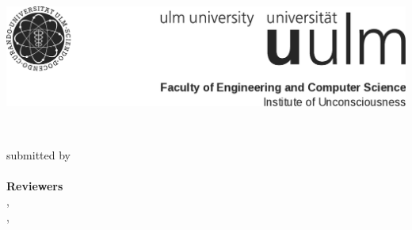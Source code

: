 \begin{titlepage}

    \begin{center}
        \includegraphics[width=\textwidth]{frontmatter/img/logowithfaculty}
    \end{center}

    \vspace{2.5cm}
    \begin{center}
    \Huge{\bfseries\thesistitle} \\
    \vspace{0.25cm}
    \Large{\thtype}

    \vspace{2.5cm}
    \Large{submitted by} \\
    \Large{\fullname} \\

    \vspace{2cm}
    \Large{\textbf{Reviewers}} \\
    \Large{\supervisorA, \supervisorAuni} \\
    \Large{\supervisorB, \supervisorBuni} \\


    \vspace{2cm}
    \Large{\thday{} \thmonth{ }\thyear}

    \end{center}
\end{titlepage}
\restoregeometry
